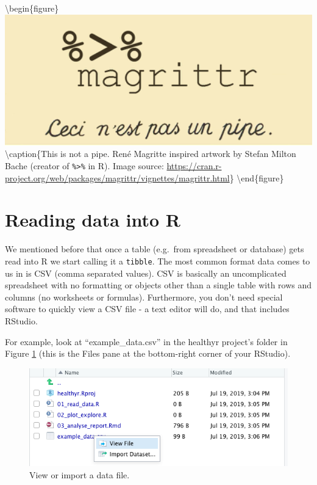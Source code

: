 \documentclass[12pt,]{krantz}
\theoremstyle{definition}
\theoremstyle{definition}
\theoremstyle{definition}
\theoremstyle{remark}
\begin{document}
\textbackslash{}begin\{figure\}
\includegraphics[width=5.56in]{images/chapter02/magrittr}
\textbackslash{}caption\{This is not a pipe. René Magritte inspired
artwork by Stefan Milton Bache (creator of \texttt{\%\textgreater{}\%}
in R). Image source:
\url{https://cran.r-project.org/web/packages/magrittr/vignettes/magrittr.html}\}\label{fig:chap2-fig-pipe}
\textbackslash{}end\{figure\}

\hypertarget{reading-data-into-r}{%
\section{Reading data into R}\label{reading-data-into-r}}

We mentioned before that once a table (e.g.~from spreadsheet or
database) gets read into R we start calling it a \texttt{tibble}. The
most common format data comes to us in is CSV (comma separated values).
CSV is basically an uncomplicated spreadsheet with no formatting or
objects other than a single table with rows and columns (no worksheets
or formulas). Furthermore, you don't need special software to quickly
view a CSV file - a text editor will do, and that includes RStudio.

For example, look at ``example\_data.csv'' in the healthyr project's
folder in Figure \ref{fig:chap2-fig-examplecsv} (this is the Files pane
at the bottom-right corner of your RStudio).

\begin{figure}
\includegraphics[width=7.68in]{images/chapter02/files_csv_example} \caption{View or import a data file.}\label{fig:chap2-fig-examplecsv}
\end{figure}
\end{document}
